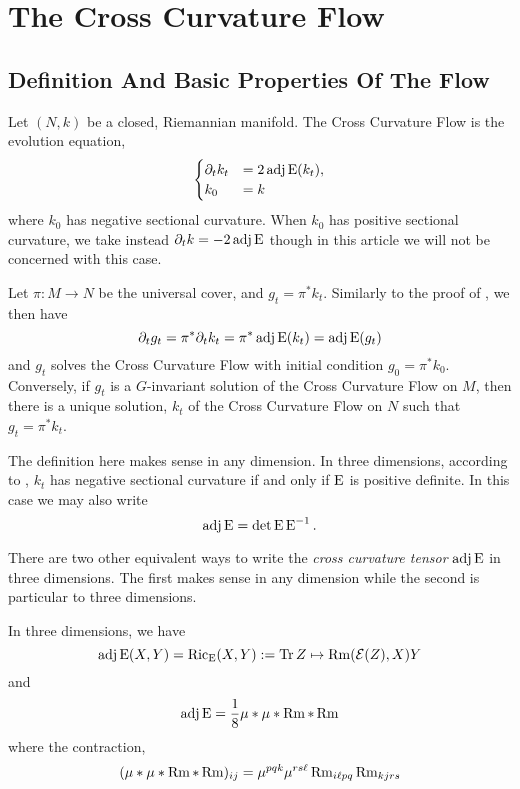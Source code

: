\documentclass[a4paper, 12pt]{amsart}
\begin{document}
\section{The Cross Curvature Flow}
\label{sec:xcf}

\subsection{Definition And Basic Properties Of  The Flow}
\label{subsec:xcf_defn}

Let \((N, k)\) be a closed, Riemannian manifold. The Cross Curvature Flow is the evolution equation,
\begin{equation}
\label{eq:xcf}
\begin{cases}
\partial_t k_t  &= 2 \operatorname{adj}\operatorname{E}(k_t), \\
k_0 &= k
\end{cases}
\end{equation}
where \(k_0\) has negative sectional curvature. When \(k_0\) has positive sectional curvature, we take instead \(\partial_t k = -2\operatorname{adj}\operatorname{E}\) though in this article we will not be concerned with this case.

\begin{rem}
Let \(\pi : M \to N\) be the universal cover, and \(g_t = \pi^{\ast} k_t\). Similarly to the proof of , we then have
\[
\partial_t g_t = \pi^{\ast} \partial_t k_t = \pi^{\ast} \operatorname{adj}\operatorname{E}(k_t) = \operatorname{adj}\operatorname{E}(g_t)
\]
and \(g_t\) solves the Cross Curvature Flow with initial condition \(g_0 = \pi^{\ast} k_0\). Conversely, if \(g_t\) is a \(G\)-invariant solution of the Cross Curvature Flow on \(M\), then there is a unique solution, \(k_t\) of the Cross Curvature Flow on \(N\) such that \(g_t = \pi^{\ast} k_t\).
\end{rem}

The definition here makes sense in any dimension. In three dimensions, according to , \(k_t\) has negative sectional curvature if and only if \(\operatorname{E}\) is positive definite. In this case we may also write
\[
\operatorname{adj}\operatorname{E} = \det \operatorname{E} \operatorname{E}^{-1}.
\]

There are two other equivalent ways to write the \emph{cross curvature tensor} \(\operatorname{adj}\operatorname{E}\) in three dimensions. The first makes sense in any dimension while the second is particular to three dimensions.

\begin{lemma}
\label{eq:xcf_equiv}
In three dimensions, we have
\[
\operatorname{adj}\operatorname{E}(X, Y) = \operatorname{Ric}_{\operatorname{E}} (X, Y) := \operatorname{Tr} Z \mapsto \operatorname{Rm}(\operatorname{\mathcal{E}}(Z), X) Y
\]
and
\[
\operatorname{adj}\operatorname{E} = \frac{1}{8} \mu \ast \mu \ast \operatorname{Rm} \ast \operatorname{Rm}
\]
where the contraction,
\[
(\mu \ast \mu \ast \operatorname{Rm} \ast \operatorname{Rm})_{ij} = \mu^{pqk}\mu^{rs\ell}\operatorname{Rm}_{i\ell pq} \operatorname{Rm}_{kjrs}
\]
\end{lemma}
\end{document}
